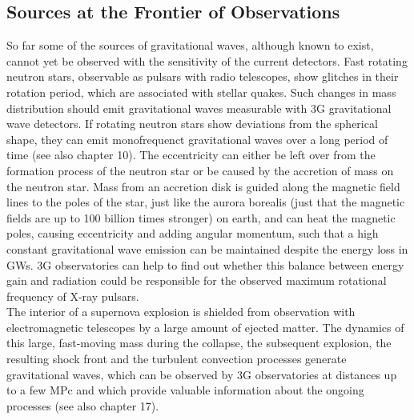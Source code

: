 \documentclass[graybox, nosecnum]{svmult}
\begin{document}
\subsection{Sources at the Frontier of Observations}
So far some of the sources of gravitational waves, although known to exist, cannot yet be observed with the sensitivity of the current detectors. 
Fast rotating neutron stars, observable as pulsars with radio telescopes, show glitches in their rotation period, which are associated with stellar quakes.  Such changes in mass distribution should emit gravitational waves measurable with 3G gravitational wave detectors. If rotating neutron stars show deviations from the spherical shape, they can emit monofrequenct gravitational waves over a long period of time {\color{green} (see also chapter 10)}. The eccentricity can either be left over from the formation process of the neutron star or be caused by the accretion of mass on the neutron star.  Mass from an accretion disk is guided along the magnetic field lines to the poles of the star, just like the aurora borealis (just that the magnetic fields are up to 100 billion times stronger) on earth, and can heat the magnetic poles, causing eccentricity and adding angular momentum, such that a high constant gravitational wave emission can be maintained despite the energy loss in GWs. 3G observatories can help to find out whether this balance between energy gain and radiation could be responsible for the observed maximum rotational frequency of X-ray pulsars.\\
The interior of a supernova explosion is shielded from observation with electromagnetic telescopes by a large amount of ejected matter. The dynamics of this large, fast-moving mass during the collapse, the subsequent explosion, the resulting shock front and the turbulent convection processes generate gravitational waves, which can be observed by 3G observatories at distances up to a few MPc and which provide valuable information about the ongoing processes {\color{green} (see also chapter 17)}. 
\end{document}
